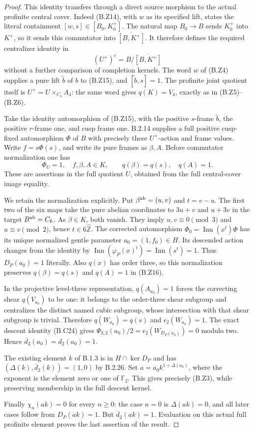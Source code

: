 \begin{proof}
This identity transfers through a direct source
morphism to the actual profinite central cover.
Indeed (B.Z14), with $w$ as its specified lift,
states the literal containment
$[w,s]\in[B_0,K_0^+]$.
The natural map $B_0\to B$ sends $K_0^+$ into
$K^+$, so it sends this commutator into
$\overline{[B,K^+]}$.  It therefore defines the
required centralizer identity in
\[
              (U^+)^{\mathrm c}=B/\overline{[B,K^+]}
 \tag{B.Z15}
\]
without a further comparison of completion kernels.
The word $w$ of (B.Z4) supplies a pure lift
$\widetilde b$ of $b$ to (B.Z15), and
$[\widetilde b,s]=1$.
The profinite joint quotient itself is
$U^+=U\times_{C_3}A_4$: the same word gives
$q(K)=V_4$, exactly as in (B.Z5)--(B.Z6).

Take the identity automorphism of (B.Z15), with
the positive $s$-frame $\widetilde b$, the
positive $r$-frame one, and cusp frame one.
B.2.14 supplies a full positive cusp-fixed
automorphism $\Phi$ of $B$ with precisely these
$U^+$-action and frame values.  Write
$f=s\Phi(s)$, and write its pure frames as
$\beta,A$.  Before commutator normalization one has
\[
 \Phi_U=1,\quad f,\beta,A\in K,\qquad
                   q(\beta)=q(s),\quad q(A)=1.
 \tag{B.Z16}
\]
These are assertions in the full quotient $U$,
obtained from the full central-cover image equality.

We retain the normalization explicitly.  Put
$\beta^{\rm ab}=(u,v)$ and $t=v-u$.
The first two of the six maps take the pure
abelian coordinates to $3u+v$ and $u+3v$ in
the target $B^{\rm ab}=C_6$.  As $\beta\in K$,
both vanish.  They imply $u,v\equiv0\pmod3$
and $u\equiv v\pmod2$, hence
$t\in6\widehat{\mathbb Z}$.
The corrected automorphism
$\Phi_0=\operatorname{Inn}(x^t)\Phi$
has its unique normalized gentle parameter
$a_0=(1,f_0)\in H$.  Its descended action changes
from the identity by
$\operatorname{Inn}(\varphi_P(x)^t)
=\operatorname{Inn}(s^t)=1$.
Thus $D_P(a_0)=1$ literally.  Also $q(x)$ has
order three, so this normalization preserves
$q(\beta)=q(s)$ and $q(A)=1$ in (B.Z16).

In the projective level-three representation,
$q(A_{a_0})=1$ forces the correcting shear
$q(V_{a_0})$ to be one: it belongs to the
order-three shear subgroup and centralizes the
distinct named cubic subgroup, whose intersection
with that shear subgroup is trivial.  Therefore
$q(W_{a_0})=q(s)$ and
$\epsilon_2(W_{a_0})=1$.
The exact descent identity (B.C24) gives
$\Psi_{3,2}(a_0)/2=
\epsilon_2(W_{D_P(a_0)})=0$ modulo two.
Hence $\overline d_2(a_0)=d_2(a_0)=1$.

The existing element $k$ of B.1.3 is in
$H\cap\ker D_P$ and has
$(\Delta(k),\overline d_2(k))=(1,0)$ by B.2.26.
Set $a=a_0 k^{1+\Delta(a_0)}$, where the exponent
is the element zero or one of $\mathbb F_2$.
This gives precisely (B.Z3), while preserving
membership in the full descent kernel.

Finally $\chi_n(ak)=0$ for every $n\geq0$:
the case $n=0$ is $\Delta(ak)=0$, and all later
cases follow from $D_P(ak)=1$.
But $\overline d_2(ak)=1$.  Evaluation on this
actual full profinite element proves the last
assertion of the result.
\end{proof}
